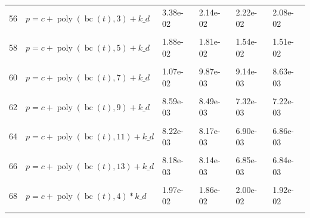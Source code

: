 \documentclass[12pt,a4paper]{article}
\DeclareMathOperator{\bc}{bc}
\DeclareMathOperator{\poly}{poly}
\begin{document}
\begin{longtable}[t]{ll>{\raggedleft\arraybackslash}p{2cm}>{\raggedleft\arraybackslash}p{2cm}>{\raggedleft\arraybackslash}p{2cm}>{\raggedleft\arraybackslash}p{2cm}}
56 & $p = c + \poly\left( \bc(t), 3 \right) + k\_d$ & 3.38e-02 & 2.14e-02 & 2.22e-02 & 2.08e-02\\
\cellcolor{gray!6}{57} & \cellcolor{gray!6}{$p = c + \poly\left( \bc(t), 4 \right) + k\_d$} & \cellcolor{gray!6}{2.15e-02} & \cellcolor{gray!6}{2.04e-02} & \cellcolor{gray!6}{2.11e-02} & \cellcolor{gray!6}{2.05e-02}\\
58 & $p = c + \poly\left( \bc(t), 5 \right) + k\_d$ & 1.88e-02 & 1.81e-02 & 1.54e-02 & 1.51e-02\\
\cellcolor{gray!6}{59} & \cellcolor{gray!6}{$p = c + \poly\left( \bc(t), 6 \right) + k\_d$} & \cellcolor{gray!6}{1.07e-02} & \cellcolor{gray!6}{9.96e-03} & \cellcolor{gray!6}{9.39e-03} & \cellcolor{gray!6}{8.78e-03}\\
60 & $p = c + \poly\left( \bc(t), 7 \right) + k\_d$ & 1.07e-02 & 9.87e-03 & 9.14e-03 & 8.63e-03\\
\cellcolor{gray!6}{61} & \cellcolor{gray!6}{$p = c + \poly\left( \bc(t), 8 \right) + k\_d$} & \cellcolor{gray!6}{9.32e-03} & \cellcolor{gray!6}{8.98e-03} & \cellcolor{gray!6}{7.50e-03} & \cellcolor{gray!6}{7.45e-03}\\
62 & $p = c + \poly\left( \bc(t), 9 \right) + k\_d$ & 8.59e-03 & 8.49e-03 & 7.32e-03 & 7.22e-03\\
\cellcolor{gray!6}{63} & \cellcolor{gray!6}{$p = c + \poly\left( \bc(t), 10 \right) + k\_d$} & \cellcolor{gray!6}{8.31e-03} & \cellcolor{gray!6}{8.26e-03} & \cellcolor{gray!6}{6.92e-03} & \cellcolor{gray!6}{6.90e-03}\\
64 & $p = c + \poly\left( \bc(t), 11 \right) + k\_d$ & 8.22e-03 & 8.17e-03 & 6.90e-03 & 6.86e-03\\
\cellcolor{gray!6}{65} & \cellcolor{gray!6}{$p = c + \poly\left( \bc(t), 12 \right) + k\_d$} & \cellcolor{gray!6}{8.22e-03} & \cellcolor{gray!6}{8.17e-03} & \cellcolor{gray!6}{6.88e-03} & \cellcolor{gray!6}{6.85e-03}\\
66 & $p = c + \poly\left( \bc(t), 13 \right) + k\_d$ & 8.18e-03 & 8.14e-03 & 6.85e-03 & 6.84e-03\\
\cellcolor{gray!6}{67} & \cellcolor{gray!6}{$p = c + \poly\left( \bc(t), 3 \right) * k\_d$} & \cellcolor{gray!6}{3.27e-02} & \cellcolor{gray!6}{1.99e-02} & \cellcolor{gray!6}{2.12e-02} & \cellcolor{gray!6}{1.97e-02}\\
68 & $p = c + \poly\left( \bc(t), 4 \right) * k\_d$ & 1.97e-02 & 1.86e-02 & 2.00e-02 & 1.92e-02\\
\cellcolor{gray!6}{69} & \cellcolor{gray!6}{$p = c + \poly\left( \bc(t), 5 \right) * k\_d$} & \cellcolor{gray!6}{1.66e-02} & \cellcolor{gray!6}{1.60e-02} & \cellcolor{gray!6}{1.36e-02} & \cellcolor{gray!6}{1.33e-02}\\

\end{longtable}
\end{document}

